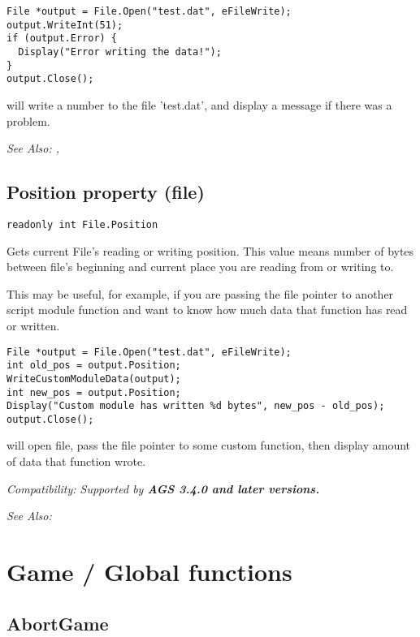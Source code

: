 \begin{verbatim}
File *output = File.Open("test.dat", eFileWrite);
output.WriteInt(51);
if (output.Error) {
  Display("Error writing the data!");
}
output.Close();
\end{verbatim}
will write a number to the file 'test.dat', and display a message if there was a problem.

\it{See Also:} , 


\subsection{Position property (file)}\label{File.Position}%

\begin{verbatim}
readonly int File.Position
\end{verbatim}
Gets current File's reading or writing position. This value means number of bytes between file's
beginning and current place you are reading from or writing to.

This may be useful, for example, if you are passing the file pointer to another script module
function and want to know how much data that function has read or written.

\begin{verbatim}
File *output = File.Open("test.dat", eFileWrite);
int old_pos = output.Position;
WriteCustomModuleData(output);
int new_pos = output.Position;
Display("Custom module has written %d bytes", new_pos - old_pos);
output.Close();
\end{verbatim}
will open file, pass the file pointer to some custom function, then display amount of data that function wrote.

\it{Compatibility:} Supported by \bf{AGS 3.4.0} and later versions.

\it{See Also:} 



\section{Game / Global functions}\label{GlobalCommands}%



\subsection{AbortGame}\label{AbortGame}%

